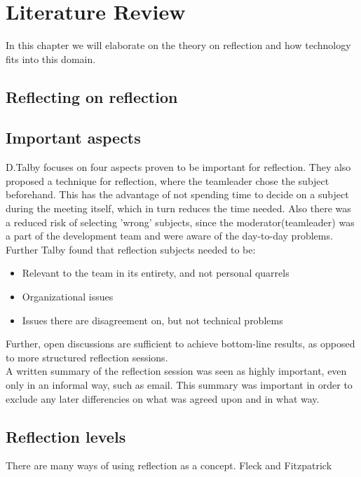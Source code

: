 \section{Literature Review}
\label{sec:literaturereview}
In this chapter we will elaborate on the theory on reflection and how technology fits into this domain. 

\subsection{Reflecting on reflection}
\subsection*{Important aspects}
D.Talby \cite{Talby2006} focuses on four aspects proven to be important for reflection. They also proposed a technique for reflection, where the teamleader chose the subject beforehand. This has the advantage of not spending time to decide on a subject during the meeting itself, which in turn reduces the time needed. Also there was a reduced risk of selecting 'wrong' subjects, since the moderator(teamleader) was a part of the development team and were aware of the day-to-day problems.\\
Further Talby found that reflection subjects needed to be:
\begin{itemize}
\item Relevant to the team in its entirety, and not personal quarrels
\item Organizational issues
\item Issues there are disagreement on, but not technical problems
\end{itemize}
Further, open discussions are sufficient to achieve bottom-line results, as opposed to more structured reflection sessions.\\
A written summary of the reflection session was seen as highly important, even only in an informal way, such as email. This summary was important in order to exclude any later differencies on what was agreed upon and in what way.
\subsection*{Reflection levels}
There are many ways of using reflection as a concept. Fleck and Fitzpatrick 


